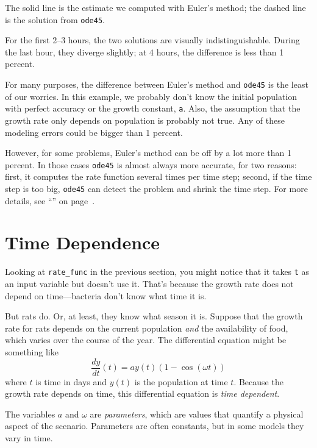 The solid line is the estimate we computed with Euler's method; the dashed line is the solution from \lstinline{ode45}.

For the first 2--3 hours, the two solutions are visually indistinguishable.  During the last hour, they diverge slightly; at 4 hours, the difference is less than 1 percent.

For many purposes, the difference between Euler's method and \lstinline{ode45} is the least of our worries.  In this example, we probably don't know the initial population with perfect accuracy or the growth constant, \lstinline{a}.  Also, the assumption that the growth rate only depends on population is probably not true.  Any of these modeling errors could be bigger than 1 percent.

However, for some problems, Euler's method can be off by a lot more than 1 percent.  
In those cases \lstinline{ode45} is almost always more accurate, for two reasons: first, it computes the rate function several times per time step; second, if the time step is too big, \lstinline{ode45} can detect the problem and shrink the time step.  For more details, see ``'' on page~\pageref{howode45}.


\section{Time Dependence}

Looking at \lstinline{rate_func} in the previous section, you might notice that it takes \lstinline{t} as an input variable but doesn't use it.  That's because the growth rate does not depend on time---bacteria don't know what time it is.


But rats do.  Or, at least, they know what season it is.
Suppose that the growth rate for rats depends on the current population \emph{and} the availability of food, which varies over the course of the year.
The differential equation might be something like
%
\begin{equation*}
\frac{dy}{dt}(t) = a y(t) \left(1 - \cos (\omega t) \right)
\end{equation*}
%
where $t$ is time in days and $y(t)$ is the population at time $t$.
Because the growth rate depends on time, this differential equation is \emph{time dependent}.

The variables $a$ and $\omega$ are \emph{parameters}, which are values that
quantify a physical aspect of the scenario.  Parameters are often constants, but in some models they vary in time.

